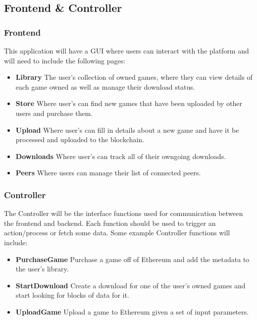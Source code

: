 \subsection{Frontend \& Controller}

\subsubsection{Frontend}

This application will have a GUI where users can interact with the platform and will need to include the following pages:

\begin{itemize}
  \item \textbf{Library} The user's collection of owned games, where they can view details of each game owned as well as manage their download status.
  \item \textbf{Store} Where user's can find new games that have been uploaded by other users and purchase them.
  \item \textbf{Upload} Where user's can fill in details about a new game and have it be processed and uploaded to the blockchain.
  \item \textbf{Downloads} Where user's can track all of their owngoing downloads.
  \item \textbf{Peers} Where users can manage their list of connected peers.
\end{itemize}


\subsubsection{Controller}

The Controller will be the interface functions used for communication between the frontend and backend. Each function should be used to trigger an action/process or fetch some data. Some example Controller functions will include:

\begin{itemize}
  \item \textbf{PurchaseGame} Purchase a game off of Ethereum and add the metadata to the user's library.
  \item \textbf{StartDownload} Create a download for one of the user's owned games and start looking for blocks of data for it.
  \item \textbf{UploadGame} Upload a game to Ethereum given a set of input parameters.
\end{itemize}